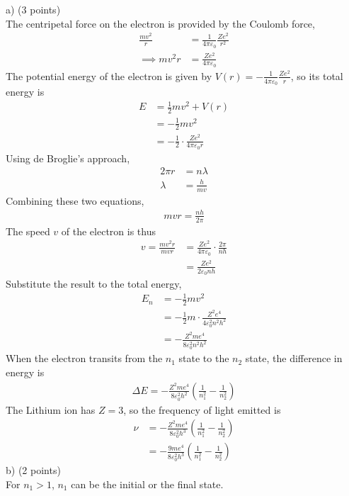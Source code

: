 \documentclass[12pt]{book} %
\numberwithin{equation}{chapter}
\def\D{\Delta}
\def\e{\varepsilon}
\def\l{\lambda}
\begin{document}
\begin{solbox}
a) (3 points)\\
The centripetal force on the electron is provided by the Coulomb force,
\begin{align*}
\frac{mv^{2}}{r}&=\frac{1}{4\pi\e_{0}}\frac{Ze^{2}}{r^{2}}\\
\implies mv^{2}r&=\frac{Ze^{2}}{4\pi\e_{0}}
\end{align*}
The potential energy of the electron is given by $V(r)=-\frac{1}{4\pi\e_{0}}\frac{Ze^{2}}{r}$, so its total energy is
\begin{align*}
E&=\frac{1}{2}mv^{2}+V(r)\\
&=-\frac{1}{2}mv^{2}\\
&=-\frac{1}{2}\cdot\frac{Ze^{2}}{4\pi\e_{0}r}
\end{align*}
Using de Broglie's approach,
\begin{align*}
2\pi r&=n\l\\
\l&=\frac{h}{mv}
\end{align*}
Combining these two equations,
\begin{align*}
mvr=\frac{nh}{2\pi}
\end{align*}
The speed $v$ of the electron is thus
\begin{align*}
v=\frac{mv^{2}r}{mvr}&=\frac{Ze^{2}}{4\pi\e_{0}}\cdot \frac{2\pi}{nh}\\
&=\frac{Ze^{2}}{2\e_{0}nh}
\end{align*}
Substitute the result to the total energy,
\begin{align*}
E_{n}&=-\frac{1}{2}mv^{2}\\
&=-\frac{1}{2}m\cdot \frac{Z^{2}e^{4}}{4\e_{0}^{2}n^{2}h^{2}}\\
&=-\frac{Z^{2}me^{4}}{8\e_{0}^{2}n^{2}h^{2}}
\end{align*}
When the electron transits from the $n_{1}$ state to the $n_{2}$ state, the difference in energy is
\begin{align*}
\D E=-\frac{Z^{2}me^{4}}{8\e_{0}^{2}h^{2}}\left(\frac{1}{n_{1}^{2}}-\frac{1}{n_{2}^{2}}\right)
\end{align*}
The Lithium ion has $Z=3$, so the frequency of light emitted is
\begin{align*}
\nu&=-\frac{Z^{2}me^{4}}{8\e_{0}^{2}h^{3}}\left(\frac{1}{n_{1}^{2}}-\frac{1}{n_{2}^{2}}\right)\\
&=-\frac{9me^{4}}{8\e_{0}^{2}h^{3}}\left(\frac{1}{n_{1}^{2}}-\frac{1}{n_{2}^{2}}\right)
\end{align*}
b) (2 points)\\
For $n_{1}>1$, $n_{1}$ can be the initial or the final state.

\end{solbox}
\end{document}
